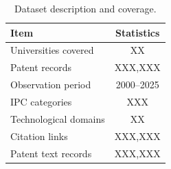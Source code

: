 
\begin{table}[t]
\centering
\caption{Dataset description and coverage.}
\begin{tabular}{lc}
\toprule
Item & Statistics \\
\midrule
Universities covered & XX \\
Patent records & XXX,XXX \\
Observation period & 2000--2025 \\
IPC categories & XXX \\
Technological domains & XX \\
Citation links & XXX,XXX \\
Patent text records & XXX,XXX \\
\bottomrule
\end{tabular}
\label{tab:data}
\end{table}

